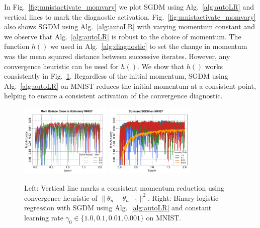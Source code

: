 \documentclass[conference]{IEEEtran}
\begin{document}
In Fig.~\ref{fig:mnistactivate_momvary} we plot SGDM using Alg.~\ref{alg:autoLR} and vertical lines to mark the diagnostic activation.
Fig.~\ref{fig:mnistactivate_momvary} also shows SGDM using Alg.~\ref{alg:autoLR} with varying momentum constant and we observe that Alg.~\ref{alg:autoLR} is robust to the choice of momentum.
The function $h()$ we used in Alg.~\ref{alg:diagnostic} to set the change in momentum was the mean squared distance between successive iterates. 
However, any convergence heuristic can be used for $h()$.
We show that $h()$ works consistently in Fig.~\ref{fig:momred_constlr}.
Regardless of the initial momentum, SGDM using Alg.~\ref{alg:autoLR} on MNIST reduces the initial momentum at a consistent point, helping to ensure a consistent activation of the convergence diagnostic.
\begin{figure}[ht]
\begin{center}
  \includegraphics[width=1.7in]{fig/RFig4_CheckStat.pdf}\hspace{-0.12in}
\includegraphics[width=1.7in]{fig/RFig5_Const.pdf}
\end{center}
\vspace{-0.17in}
  \caption{Left: Vertical line marks a consistent momentum reduction using convergence heuristic of $\| \theta_n - \theta_{n-1} \|^2$.
  Right: Binary logistic regression with SGDM using Alg.~\ref{alg:autoLR} and constant learning rate $\gamma_0 \in \{1.0, 0.1, 0.01, 0.001\}$ on MNIST.
  }
\label{fig:momred_constlr}\vspace{-0.15in}
\end{figure}
\end{document}
